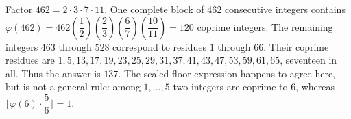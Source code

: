 Factor $462=2\cdot3\cdot7\cdot11$. One complete block of $462$ consecutive integers contains $\varphi(462)=462(\dfrac{1}{2})(\dfrac{2}{3})(\dfrac{6}{7})(\dfrac{10}{11})=120$ coprime integers. The remaining integers $463$ through $528$ correspond to residues $1$ through $66$. Their coprime residues are $1,5,13,17,19,23,25,29,31,37,41,43,47,53,59,61,65$, seventeen in all. Thus the answer is $\boxed{137}$. The scaled-floor expression happens to agree here, but is not a general rule: among $1,\ldots,5$ two integers are coprime to $6$, whereas $\lfloor\varphi(6)\cdot\dfrac{5}{6}\rfloor=1$.

